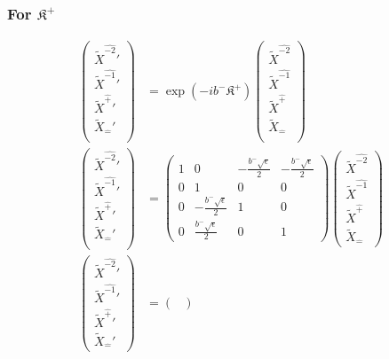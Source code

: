 \documentclass[]{article}
\numberwithin{equation}{section}
\begin{document}
{{\subsubsection{For $\mathfrak{K}^{+}$}
\begin{align}
\begin{pmatrix}
    \tilde{X}^{\hat{-2}}'\\
    \tilde{X}^{\hat{-1}}'\\
    \tilde{X}^{\hat{+}}'\\
    \tilde{X}_{\hat{-}}'\\
    \end{pmatrix}&= \exp{\left(-ib^{-}\mathfrak{K}^{+}\right)}\begin{pmatrix}
    \tilde{X}^{\hat{-2}}\\
    \tilde{X}^{\hat{-1}}\\
    \tilde{X}^{\hat{+}}\\
    \tilde{X}_{\hat{-}}\\
    \end{pmatrix}\\
    \begin{pmatrix}
    \tilde{X}^{\hat{-2}}'\\
    \tilde{X}^{\hat{-1}}'\\
    \tilde{X}^{\hat{+}}'\\
    \tilde{X}_{\hat{-}}'\\
    \end{pmatrix}&= \begin{pmatrix}
        1&0&-\frac{b^{-}\sqrt{\epsilon}}{2}&-\frac{b^{-}\sqrt{\epsilon}}{2}\\
        0&1&0&0\\
        0&-\frac{b^{-}\sqrt{\epsilon}}{2}&1&0\\
        0&\frac{b^{-}\sqrt{\epsilon}}{2}&0&1
    \end{pmatrix}\begin{pmatrix}
    \tilde{X}^{\hat{-2}}\\
    \tilde{X}^{\hat{-1}}\\
    \tilde{X}^{\hat{+}}\\
    \tilde{X}_{\hat{-}}
    \end{pmatrix}\\
    \begin{pmatrix}
    \tilde{X}^{\hat{-2}}'\\
    \tilde{X}^{\hat{-1}}'\\
    \tilde{X}^{\hat{+}}'\\
    \tilde{X}_{\hat{-}}'
    \end{pmatrix}&= \begin{pmatrix}

\end{pmatrix}
\end{align}}}
\end{document}
